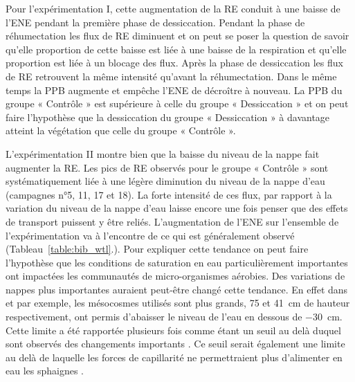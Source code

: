 Pour l'expérimentation I, cette augmentation de la RE conduit à une baisse de l'ENE pendant la première phase de dessiccation.
Pendant la phase de réhumectation les flux de RE diminuent et on peut se poser la question de savoir qu'elle proportion de cette baisse est liée à une baisse de la respiration et qu'elle proportion est liée à un blocage des flux.
Après la phase de dessiccation les flux de RE retrouvent la même intensité qu'avant la réhumectation.
Dans le même temps la PPB augmente et empêche l'ENE de décroître à nouveau.
La PPB du groupe « Contrôle » est supérieure à celle du groupe « Dessiccation » et on peut faire l'hypothèse que la dessiccation du groupe « Dessiccation » à davantage atteint la végétation que celle du groupe « Contrôle ».

L'expérimentation II montre bien que la baisse du niveau de la nappe fait augmenter la RE.
Les pics de RE observés pour le groupe « Contrôle » sont systématiquement liée à une légère diminution du niveau de la nappe d'eau (campagnes n°5, 11, 17 et 18).
La forte intensité de ces flux, par rapport à la variation du niveau de la nappe d'eau laisse encore une fois penser que des effets de transport puissent y être reliés.
L'augmentation de l'ENE sur l'ensemble de l'expérimentation va à l'encontre de ce qui est généralement observé (Tableau~\ref{table:bib_wtl}.).
Pour expliquer cette tendance on peut faire l'hypothèse que les conditions de saturation en eau particulièrement importantes ont impactées les communautés de micro-organismes aérobies.
Des variations de nappes plus importantes auraient peut-être changé cette tendance.
En effet dans \citet{blodau2004} et \citet{dinsmore2009} par exemple, les mésocosmes utilisés sont plus grands, 75 et \SI{41}{\centi\metre} de hauteur respectivement, ont permis d'abaisser le niveau de l'eau en dessous de \SI{-30}{\centi\metre}.
Cette limite a été rapportée plusieurs fois comme étant un seuil au delà duquel sont observés des changements importants \citep{blodau2004,peichl2014}.
Ce seuil serait également une limite au delà de laquelle les forces de capillarité ne permettraient plus d'alimenter en eau les sphaignes \citep{rydin2013a,ketcheson2014}.

